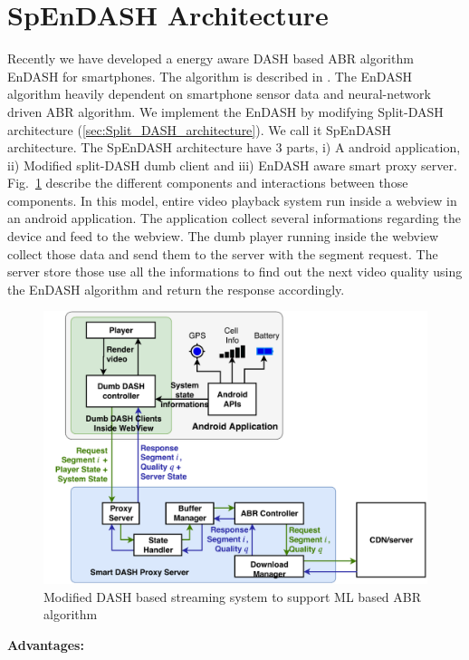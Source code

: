 

\section{SpEnDASH Architecture}
Recently we have developed a energy aware DASH based ABR algorithm EnDASH for smartphones. The algorithm is described in . The EnDASH algorithm heavily dependent on smartphone sensor data and neural-network driven ABR algorithm. We implement the EnDASH by modifying Split-DASH architecture (\ref{sec:Split_DASH_architecture}). We call it SpEnDASH architecture. The SpEnDASH architecture have 3 parts, i) A android application, ii) Modified split-DASH dumb client and iii) EnDASH aware smart proxy server. Fig.~\ref{fig:playerDiagram_SpEnDASH} describe the different components and interactions between those components. In this model, entire video playback system run inside a webview in an android application. The application collect several informations regarding the device and feed to the webview. The dumb player running inside the webview collect those data and send them to the server with the segment request. The server store those use all the informations to find out the next video quality using the EnDASH algorithm and return the response accordingly.
\begin{figure}[h!]
	\begin{center}
		\includegraphics[width=0.9\linewidth]{img/playerDiagram_SpEnDASH}
	\end{center}
	\caption{\label{fig:playerDiagram_SpEnDASH} Modified DASH based streaming system to support ML based ABR algorithm}
\end{figure}

{\bf Advantages:}